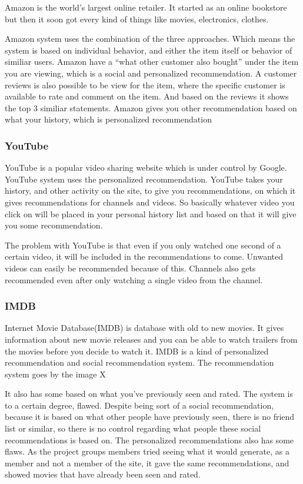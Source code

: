 Amazon is the world’s largest online retailer. It started as an online bookstore but then it soon got every kind of things like movies, electronics, clothes.

Amazon system uses the combination of the three approaches. Which means the system is based on individual behavior, and either the item itself or behavior of similiar users. Amazon have a “what other customer also bought” under the item you are viewing, which is a social and personalized recommendation. A customer reviews is also possible to be view for the item, where the specific customer is available to rate and comment on the item. And based on the reviews it shows the top 3 similiar statements. Amazon gives you other recommendation based on what your history, which is personalized recommendation

\subsubsection{YouTube}

YouTube is a popular video sharing website which is under control by Google. YouTube system uses the personalized recommendation. YouTube takes your history, and other activity on the site, to give you recommendations, on which it gives recommendations for channels and videos. So basically whatever video you click on will be placed in your personal history list and based on that it will give you some recommendation.

The problem with YouTube is that even if you only watched one second of a certain video, it will be included in the recommendations to come. Unwanted videos can easily be recommended because of this. Channels also gets recommended even after only watching a single video from the channel.

\subsubsection{IMDB}

Internet Movie Database(IMDB) is database with old to new movies. It gives information about new movie releases and you can be able to watch trailers from the movies before you decide to watch it. IMDB is a kind of  personalized recommendation and social recommendation system. The recommendation system goes by the image X

It also has some based on what you’ve previously seen and rated. The system is to a certain degree, flawed. Despite being sort of a social recommendation, because it is based on what other people have previously seen, there is no friend list or similar, so there is no control regarding what people these social recommendations is based on. The personalized recommendations also has some flaws. As the project groups members tried seeing what it would generate, as a member and not a member of the site, it gave the same recommendations, and showed movies that have already been seen and rated.

